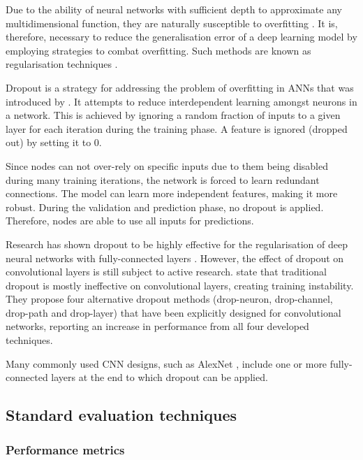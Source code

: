 \documentclass{l4proj}
\begin{document}
Due to the ability of neural networks with sufficient depth to approximate any multidimensional function, they are naturally susceptible to overfitting \citep{tetko_neural_1995}. It is, therefore, necessary to reduce the generalisation error of a deep learning model by employing strategies to combat overfitting. Such methods are known as regularisation techniques \citep{goodfellow_deep_2016}.

Dropout is a strategy for addressing the problem of overfitting in ANNs that was introduced by \citet{srivastava_dropout_2014}. It attempts to reduce interdependent learning amongst neurons in a network. This is achieved by ignoring a random fraction of inputs to a given layer for each iteration during the training phase. A feature is ignored (dropped out) by setting it to 0.

Since nodes can not over-rely on specific inputs due to them being disabled during many training iterations, the network is forced to learn redundant connections. The model can learn more independent features, making it more robust. During the validation and prediction phase, no dropout is applied. Therefore, nodes are able to use all inputs for predictions.

Research has shown dropout to be highly effective for the regularisation of deep neural networks with fully-connected layers \citep{wu_towards_2015}. However, the effect of dropout on convolutional layers is still subject to active research. \citet{cai_effective_2019} state that traditional dropout is mostly ineffective on convolutional layers, creating training instability. They propose four alternative dropout methods (drop-neuron, drop-channel, drop-path and drop-layer) that have been explicitly designed for convolutional networks, reporting an increase in performance from all four developed techniques. 

Many commonly used CNN designs, such as AlexNet \citep{krizhevsky_imagenet_2012}, include one or more fully-connected layers at the end to which dropout can be applied. 

\subsection{Standard evaluation techniques}

\subsubsection{Performance metrics}
\end{document}

